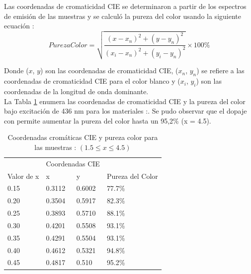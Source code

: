 Las coordenadas de cromaticidad CIE se determinaron a partir de los espectros
de emisión de las muestras y se calculó la pureza del color usando la siguiente
ecuación \cite{KaviRasu2017}:\\

\begin{equation}
    PurezaColor = \sqrt{\frac{(x-x_n)^2+(y-y_n)^2}{(x_i-x_n)^2+(y_i-y_n)^2}}
    \times 100\%
    \label{eqn:eq5}
\end{equation}

Donde ($x$, $y$) son las coordenadas de cromaticidad CIE, ($x_n$, $y_n$) se
refiere a las coordenadas de cromaticidad CIE para el color blanco y ($x_i$,
$y_i$) son las
coordenadas de la longitud de onda dominante.\\

La Tabla \ref{tab:croma} enumera las coordenadas de cromaticidad CIE
y la pureza del color bajo excitación de 436 nm para los materiales
:. Se pudo observar que el dopaje con
 permite aumentar
la pureza del color hasta un 95,2\% (x = 4.5).\\

\begin{table}[]
    \centering
    \caption{Coordenadas cromáticas CIE y pureza color para las muestras : $(1.5\leq x\leq 4.5)$}
    \label{tab:croma}
    \begin{tabular}{llll}
    \hline
         & \multicolumn{2}{l}{Coordenadas CIE} &       \\ \cline{2-3}
    \multirow{-2}{*}{Valor de x} & x & y & \multirow{-2}{*}{Pureza del Color} \\ \hline
    0.15 & 0.3112           & 0.6002           & 77.7\% \\
     
    0.20 & 0.3504           & 0.5917           & 82.3\% \\
    0.25 & 0.3893           & 0.5710           & 88.1\% \\
     
    0.30 & 0.4201           & 0.5508           & 93.1\% \\
    0.35 & 0.4291           & 0.5504           & 93.1\% \\
     
    0.40 & 0.4612           & 0.5321           & 94.8\% \\
    0.45 & 0.4817           & 0.510            & 95.2\% \\ \hline
    \end{tabular}
    \end{table}

